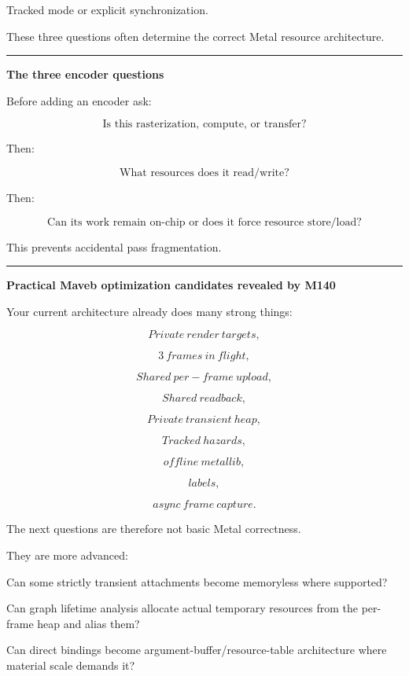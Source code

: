 Tracked mode or explicit synchronization.

These three questions often determine the correct Metal resource architecture.

\begin{center}\rule{0.5\linewidth}{0.5pt}\end{center}

\textbf{The three encoder questions}

Before adding an encoder ask:

\[
\boxed{
\text{Is this rasterization, compute, or transfer?}
}
\]

Then:

\[
\boxed{
\text{What resources does it read/write?}
}
\]

Then:

\[
\boxed{
\text{Can its work remain on-chip or does it force resource store/load?}
}
\]

This prevents accidental pass fragmentation.

\begin{center}\rule{0.5\linewidth}{0.5pt}\end{center}

\textbf{Practical Maveb optimization candidates revealed by M140}

Your current architecture already does many strong things:

\[
Private\ render\ targets,
\]

\[
3\ frames\ in\ flight,
\]

\[
Shared\ per-frame\ upload,
\]

\[
Shared\ readback,
\]

\[
Private\ transient\ heap,
\]

\[
Tracked\ hazards,
\]

\[
offline\ metallib,
\]

\[
labels,
\]

\[
async\ frame\ capture.
\]

The next questions are therefore not basic Metal correctness.

They are more advanced:

Can some strictly transient attachments become memoryless where supported?

Can graph lifetime analysis allocate actual temporary resources from the per-frame heap and alias them?

Can direct bindings become argument-buffer/resource-table architecture where material scale demands it?

